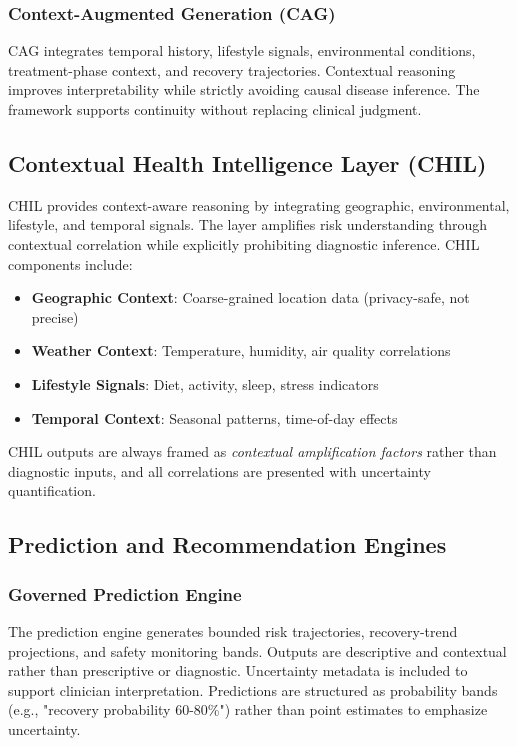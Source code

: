 \documentclass[conference]{IEEEtran}
\begin{document}
\subsubsection{Context-Augmented Generation (CAG)}
CAG integrates temporal history, lifestyle signals, environmental conditions, treatment-phase context, and recovery trajectories. Contextual reasoning improves interpretability while strictly avoiding causal disease inference. The framework supports continuity without replacing clinical judgment.

\subsection{Contextual Health Intelligence Layer (CHIL)}
CHIL provides context-aware reasoning by integrating geographic, environmental, lifestyle, and temporal signals. The layer amplifies risk understanding through contextual correlation while explicitly prohibiting diagnostic inference. CHIL components include:

\begin{itemize}
    \item \textbf{Geographic Context}: Coarse-grained location data (privacy-safe, not precise)
    \item \textbf{Weather Context}: Temperature, humidity, air quality correlations
    \item \textbf{Lifestyle Signals}: Diet, activity, sleep, stress indicators
    \item \textbf{Temporal Context}: Seasonal patterns, time-of-day effects
\end{itemize}

CHIL outputs are always framed as \textit{contextual amplification factors} rather than diagnostic inputs, and all correlations are presented with uncertainty quantification.

\subsection{Prediction and Recommendation Engines}

\subsubsection{Governed Prediction Engine}
The prediction engine generates bounded risk trajectories, recovery-trend projections, and safety monitoring bands. Outputs are descriptive and contextual rather than prescriptive or diagnostic. Uncertainty metadata is included to support clinician interpretation. Predictions are structured as probability bands (e.g., "recovery probability 60-80\%") rather than point estimates to emphasize uncertainty.
\end{document}
